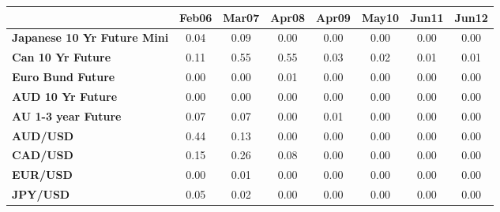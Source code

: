 \begin{scriptsize}
\begin{tabular}{lccccccc}
&\textbf{Feb06}&\textbf{Mar07}&\textbf{Apr08}&\textbf{Apr09}&\textbf{May10}&\textbf{Jun11}&\textbf{Jun12}\\\hline
\textbf{Japanese 10 Yr Future Mini}&0.04&0.09&0.00&0.00&0.00&0.00&0.00\\
\textbf{Can 10 Yr Future}&0.11&0.55&0.55&0.03&0.02&0.01&0.01\\
\textbf{Euro Bund Future}&0.00&0.00&0.01&0.00&0.00&0.00&0.00\\
\textbf{AUD 10 Yr Future}&0.00&0.00&0.00&0.00&0.00&0.00&0.00\\
\textbf{AU 1-3 year Future}&0.07&0.07&0.00&0.01&0.00&0.00&0.00\\
\textbf{AUD/USD}&0.44&0.13&0.00&0.00&0.00&0.00&0.00\\
\textbf{CAD/USD}&0.15&0.26&0.08&0.00&0.00&0.00&0.00\\
\textbf{EUR/USD}&0.00&0.01&0.00&0.00&0.00&0.00&0.00\\
\textbf{JPY/USD}&0.05&0.02&0.00&0.00&0.00&0.00&0.00\\
\end{tabular}
\end{scriptsize}
